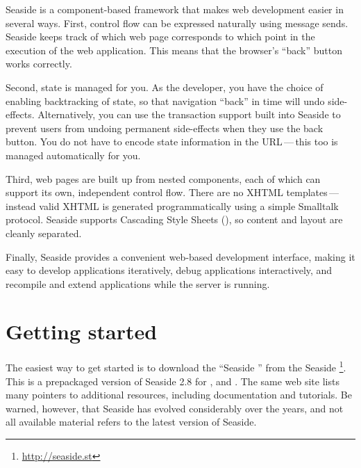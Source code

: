 \documentclass[a4paper,10pt,twoside]{book}
\begin{document}
Seaside is a component-based framework that makes web development easier in several ways.
First,  control flow can be expressed naturally using message sends.
Seaside keeps track of which web page corresponds to which point in the execution of the web application.
This means that the browser's ``back'' button works correctly.

Second, state is managed for you.
As the developer, you have the choice of enabling 
backtracking of state, so that navigation ``back'' in time will undo side-effects.
Alternatively, you can use the transaction support built into Seaside to prevent users from undoing permanent side-effects when they use the back button.
You do not have to encode state information in the URL\,---\,this too is managed automatically for you.

Third, web pages are built up from nested components, each of which can support its own, independent control flow.
There are no XHTML templates\,---\,instead valid XHTML is generated programmatically using a simple Smalltalk protocol.
Seaside supports Cascading Style Sheets (), so content and layout are cleanly separated.

Finally, Seaside provides a convenient web-based development interface, making it easy to develop applications iteratively, debug applications interactively, and recompile and extend applications while the server is running.

\section{Getting started}

The easiest way to get started is to download the ``Seaside '' from the Seaside \footnote{\url{http://seaside.st}}.
This is a prepackaged version of Seaside 2.8 for ,  and .
The same web site lists many pointers to additional resources, including documentation and tutorials.
Be warned, however, that Seaside has evolved considerably over the years, and not all available material refers to the latest version of Seaside.

\end{document}
